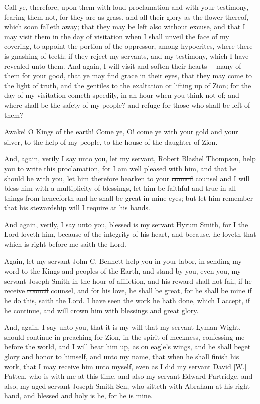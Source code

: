 				Call ye, therefore, upon them with loud proclamation and with your testimony, fearing them not, for they are as grass, and all their glory as the flower thereof, which soon falleth away; that they may be left also without excuse, and that I may visit them in the day of visitation when I shall unveil the face of my covering, to appoint the portion of the oppressor, among hypocrites, where there is gnashing of teeth; if they reject my servants, and my testimony, which I have revealed unto them. And again, I will visit and soften their hearts--- many of them for your good, that ye may find grace in their eyes, that they may come to the light of truth, and the gentiles to the exaltation or lifting up of Zion; for the day of my visitation cometh speedily, in an hour when you think not of; and where shall be the safety of my people? and refuge for those who shall be left of them?

				Awake! O Kings of the earth! Come ye, O! come ye with your gold and your silver, to the help of my people, to the house of the daughter of Zion.

				And, again, verily I say unto you, let my servant, Robert Blashel Thompson, help you to write this proclamation, for I am well pleased with him, and that he should be with you, let him therefore hearken to your \sout{council} counsel and I will bless him with a multiplicity of blessings, let him be faithful and true in all things from henceforth and he shall be great in mine eyes; but let him remember that his stewardship will I require at his hands.

				And again, verily, I say unto you, blessed is my servant Hyrum Smith, for I the Lord loveth him, because of the integrity of his heart, and because, he loveth that which is right before me saith the Lord.

				Again, let my servant John C. Bennett help you in your labor, in sending my word to the Kings and peoples of the Earth, and stand by you, even you, my servant Joseph Smith in the hour of affliction, and his reward shall not fail, if he receive \sout{council} counsel, and for his love, he shall be great, for he shall be mine if he do this, saith the Lord. I have seen the work he hath done, which I accept, if he continue, and will crown him with blessings and great glory.

				And, again, I say unto you, that it is my will that my servant Lyman Wight, should continue in preaching for Zion, in the spirit of meekness, confessing me before the world, and I will bear him up, as on eagle's wings, and he shall beget glory and honor to himself, and unto my name, that when he shall finish his work, that I may receive him unto myself, even as I did my servant David [W.] Patten, who is with me at this time, and also my servant Edward Partridge, and also, my aged servant Joseph Smith Sen, who sitteth with Abraham at his right hand, and blessed and holy is he, for he is mine.

